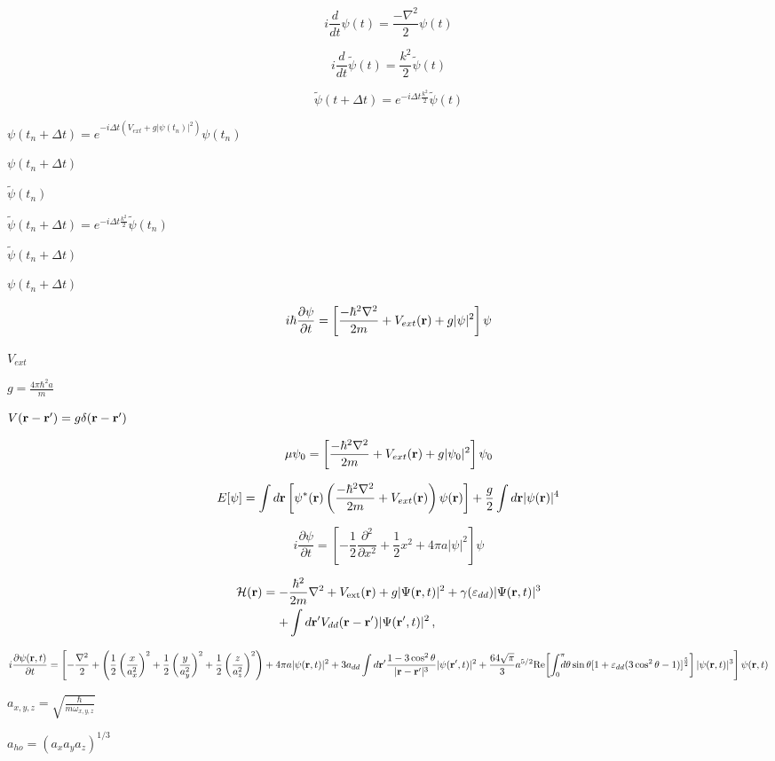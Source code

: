 \documentclass{article}
\begin{document}
\[
i\frac{d}{dt}\psi(t) = \frac{-\nabla^2}{2}\psi(t)
\]
\pagebreak

\[
i\frac{d}{dt}\tilde{\psi}(t) = \frac{k^2}{2}\tilde{\psi}(t)
\]
\pagebreak

\[
\tilde{\psi}(t+\Delta t) = e^{-i\Delta t\frac{k^2}{2}}\tilde{\psi}(t)
\]
\pagebreak

$ \psi(t_n + \Delta t) =
 e^{-i\Delta t\left( V_{ext} + g |\psi(t_n)|^2 \right)}\psi(t_n) $
\pagebreak

$ \psi(t_n + \Delta t) $
\pagebreak

$ \tilde{\psi}(t_n) $
\pagebreak

$ \tilde{\psi}(t_n+\Delta t) = e^{-i\Delta t\frac{k^2}{2}}\tilde{\psi}(t_n) $
\pagebreak

$ \tilde{\psi}(t_n+\Delta t) $
\pagebreak

$ \psi(t_n+\Delta t) $
\pagebreak

\[
 i\hbar\frac{\partial \psi}{\partial t} = \left[ \frac{-\hbar^2\nabla^2}{2m}+V_{ext}({\bf r})+g|\psi|^2
\right]\psi
\]
\pagebreak

$ V_{ext} $
\pagebreak

$ g = \frac{4\pi\hbar^2a}{m} $
\pagebreak

$ V({\bf r}-{\bf r'})=g\delta({\bf r}-{\bf r'}) $
\pagebreak

\[
 \mu \psi_0 = \left[ \frac{-\hbar^2\nabla^2}{2m}+V_{ext}({\bf r})+g|\psi_0|^2 \right]\psi_0
\]
\pagebreak

\[
 E[\psi] = \int d{\bf r} \left[ \psi^*({\bf r})\left(\frac{-\hbar^2\nabla^2}{2m}+V_{ext}({\bf r})\right)
 \psi({\bf r}) \right]+\frac{g}{2}\int d{\bf r} |\psi({\bf r})|^4
\]
\pagebreak

\[
 i\frac{\partial \psi}{\partial t} = \left[ -\frac{1}{2}\frac{\partial^2}{\partial x^2}+\frac{1}{2}x^2
 +4\pi a|\psi|^2 \right]\psi
\]
\pagebreak

\[
\begin{align}
 \mathcal{H}({\bf r})=-&\frac{\hbar^2}{2m}\nabla^2+V_{\rm ext}({\bf r})+g|\Psi({\bf r},t)|^2+\gamma
 (\varepsilon_{dd})|\Psi({\bf r},t)|^3\nonumber\\
 +& \int d{\bf r'}V_{dd}({\bf r}-{\bf r'})|\Psi({\bf r'},t)|^2\,,
\end{align}
\]
\pagebreak

\[
 i\frac{\partial \psi({\bf r},t)}{\partial t} = \left[ -\frac{\nabla^2}{2}
 + \left( \frac{1}{2} \left( \frac{x}{a_x^2} \right)^2 + \frac{1}{2} \left( \frac{y}{a_y^2} \right)^2 +
 \frac{1}{2} \left( \frac{z}{a_z^2} \right)^2  \right)
 + 4\pi a |\psi({\bf r},t)|^2
 + 3 a_{dd} \int d{\bf r'}\frac{1-3\cos^2\theta}{|{\bf r}-{\bf r}'|^3}|\psi({\bf r'},t)|^2
 + \frac{64\sqrt{\pi}}{3}a^{5/2} \mbox{Re}\bigg[\!\int_0^{\pi}
\!\!\!\!d\theta\sin\theta [1+\varepsilon_{dd}(3\cos^2\theta-1)]^{\frac{5}{2}}\bigg]\, |\psi({\bf r},t)|^3
 \right]\psi({\bf r},t)
\]
\pagebreak

$ a_{x,y,z}=\sqrt{\frac{\hbar}{m\omega_{x,y,z}}} $
\pagebreak

$ a_{ho} = (a_xa_ya_z)^{1/3} $
\pagebreak
\end{document}
